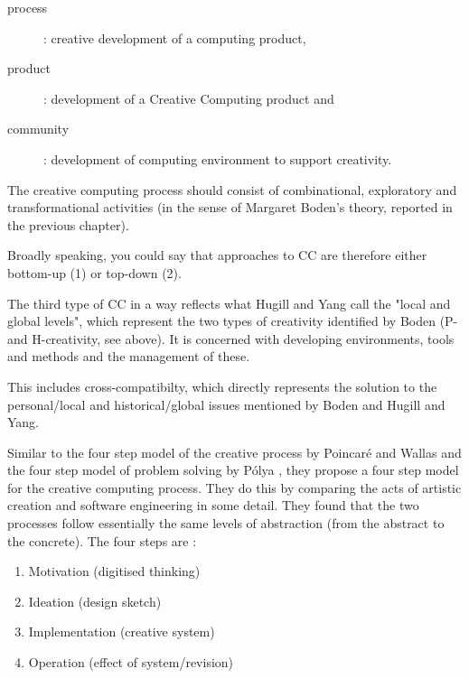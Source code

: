 \begin{description}
\item [process]:  creative development of a computing product,
\item [product]: development of a Creative Computing product and
\item [community]: development of computing environment to support creativity.
\end{description}

The creative computing process should consist of combinational, exploratory and transformational activities (in the sense of Margaret Boden’s theory, reported in the previous chapter).

\begin{draft}
Broadly speaking, you could say that approaches to CC are therefore either bottom-up (1) or top-down (2).
\end{draft}

The third type of CC in a way reflects what Hugill and Yang call the "local and global levels", which represent the two types of creativity identified by Boden (P- and H-creativity, see above). It is concerned with developing environments, tools and methods and the management of these.

\begin{draft}
This includes cross-compatibilty, which directly represents the solution to the personal/local and historical/global issues mentioned by Boden and Hugill and Yang.
\end{draft}

Similar to the four step model of the creative process by Poincaré and Wallas \citep{Poincare2001, Wallas1926} and the four step model of problem solving by Pólya \citep{Polya1957}, they propose a four step model for the creative computing process. They do this by comparing the acts of artistic creation and software engineering in some detail. They found that the two processes follow essentially the same levels of abstraction (from the abstract to the concrete). The four steps are \citep[p.15]{Polya1957}:

\begin{enumerate}
\item Motivation (digitised thinking)
\item Ideation (design sketch)
\item Implementation (creative system)
\item Operation (effect of system/revision)
\end{enumerate}

